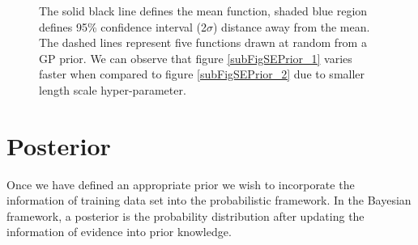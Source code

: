 \begin{figure}[!ht]
  \centering
    \quad
{}\quad
  
       \caption{The solid black line defines the mean function, shaded blue region defines 95\% confidence interval (2$\sigma$) distance away from the mean. The dashed lines represent five functions drawn at random from a GP prior. We can observe that figure \ref{subFigSEPrior_1} varies faster when compared to figure \ref{subFigSEPrior_2} due to smaller length scale hyper-parameter.       }\label{figGPPriors}
\end{figure}



\section{Posterior}\label{secPosterior}
Once we have defined an appropriate prior we wish to incorporate the information of training data set into the probabilistic framework. In the Bayesian framework, a posterior is the probability distribution after updating the information of evidence into prior knowledge. 


